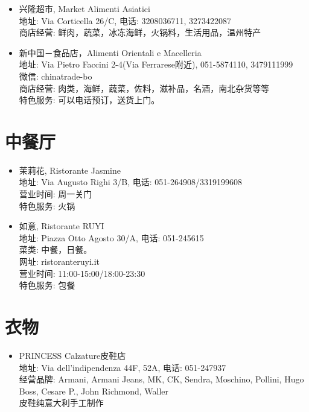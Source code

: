 \documentclass[3pt,a5paper,openright,twoside]{book}
\begin{document}
\begin{multicols}{2}

\begin{itemize}
\item 兴隆超市, Market Alimenti Asiatici\\
地址: Via Corticella 26/C, 电话: 3208036711, 3273422087\\
商店经营: 鲜肉，蔬菜，冰冻海鲜，火锅料，生活用品，温州特产

\item 新中国－食品店，Alimenti Orientali e Macelleria\\
地址: Via Pietro Faccini 2-4(Via Ferrarese附近), 051-5874110, 3479111999\\
微信: chinatrade-bo\\
商店经营: 肉类，海鲜，蔬菜，佐料，滋补品，名酒，南北杂货等等\\
特色服务: 可以电话预订，送货上门。
\end{itemize}



\section{中餐厅}
\begin{itemize}
\item 茉莉花, Ristorante Jasmine\\
地址: Via Augusto Righi 3/B, 电话: 051-264908/3319199608 \\
营业时间: 周一关门\\
特色服务: 火锅

\item 如意, Ristorante RUYI\\
地址: Piazza Otto Agosto 30/A, 电话: 051-245615\\
菜类: 中餐，日餐。\\
网址: ristoranteruyi.it \\
营业时间: 11:00-15:00/18:00-23:30\\
特色服务: 包餐
\end{itemize}


\section{衣物}
\begin{itemize}
\item PRINCESS Calzature皮鞋店\\
地址: Via dell'indipendenza 44F, 52A, 电话: 051-247937\\
经营品牌: Armani, Armani Jeans, MK, CK, Sendra, Moschino, Pollini, Hugo Boss, Cesare P., John Richmond, Waller\\
皮鞋纯意大利手工制作
\end{itemize}


\end{multicols}
% 
%
%
%
\end{document}
